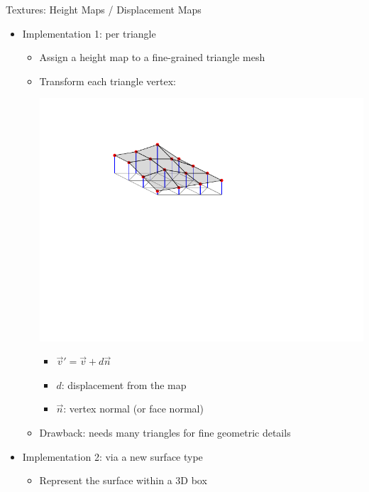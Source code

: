 \documentclass[utf8,stillsansserifmath,fleqn,t]{beamer}
\begin{document}
\begin{frame}
\frametitle{\insertsection}
Textures: Height Maps / Displacement Maps
\begin{itemize}
\item Implementation 1: per triangle
    \begin{itemize}
    \item Assign a height map to a fine-grained triangle mesh
    \item Transform each triangle vertex:\\
    \begin{minipage}{.32\textwidth}
    \includegraphics[width=\textwidth]{./fig/heightmap.pdf}
    \end{minipage}\hfill
    \begin{minipage}{.51\textwidth}
        \begin{itemize}
        \item $\vec{v}' = \vec{v} + d\vec{n}$
        \item $d$: displacement from the map
        \item $\vec{n}$: vertex normal (or face normal)
        \end{itemize}
    \end{minipage}
    \item Drawback: needs many triangles for fine geometric details
    \end{itemize}
\item Implementation 2: via a new surface type
    \begin{itemize}
    \item Represent the surface within a 3D box\\

\end{itemize}
\end{itemize}
\end{frame}
\end{document}
